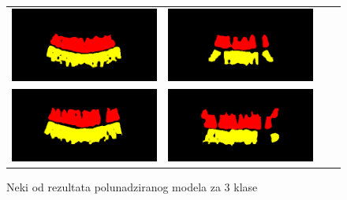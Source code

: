 \begin{figure}
\begin{tabular}{cccc}
\hspace{-1.5cm}
{\includegraphics[width = 8cm]{slike/rezultati/semisuper3klase1.png}} &
{\includegraphics[width = 8cm]{slike/rezultati/semisuper3klase2.png}}\\
\hspace{-1.5cm}
{\includegraphics[width = 8cm]{slike/rezultati/semisuper3klase3.png}} &
{\includegraphics[width = 8cm]{slike/rezultati/semisuper3klase4.png}}\\
\end{tabular}
\caption{Neki od rezultata polunadziranog modela za 3 klase}
\end{figure}

